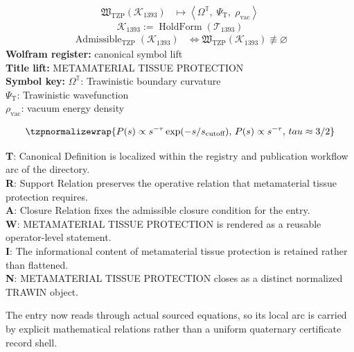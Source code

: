 \noindent
\begin{minipage}[t]{0.48\linewidth}
\begingroup
\small
\[
\begin{aligned}
\mathfrak{W}_{\mathrm{TZP}}\!\left(\mathcal{K}_{1393}\right)
&\longmapsto
\left\langle \Omega^{\mathbb{T}},\; \Psi_{\mathrm{T}},\; \rho_{\mathrm{vac}} \right\rangle
\end{aligned}
\]
\[
\mathcal{K}_{1393}
:=
\operatorname{HoldForm}\!\left(\mathcal{T}_{1393}\right)
\]
\[
\begin{aligned}
\operatorname{Admissible}_{\mathrm{TZP}}\!\left(\mathcal{K}_{1393}\right)
&\Longleftrightarrow
\mathfrak{W}_{\mathrm{TZP}}\!\left(\mathcal{K}_{1393}\right)\not\equiv\varnothing
\end{aligned}
\]
\textbf{Wolfram register:} canonical symbol lift\\
\textbf{Title lift:} METAMATERIAL TISSUE PROTECTION\\
\textbf{Symbol key:} \(\Omega^{\mathbb{T}}\): Trawinistic boundary curvature\\ \(\Psi_{\mathrm{T}}\): Trawinistic wavefunction\\ \(\rho_{\mathrm{vac}}\): vacuum energy density
\par
\endgroup
\end{minipage}\hfill
\begin{minipage}[t]{0.48\linewidth}
\[
\tzpnormalizewrap{P(s) \propto s^{-\tau} \exp(-s/s_{\text{cutoff}}),\,P(s) \propto s^{-\tau},\,tau \approx 3/2}
\]

\small
\textbf{T}: Canonical Definition is localized within the registry and publication workflow arc of the directory.\\
\textbf{R}: Support Relation preserves the operative relation that metamaterial tissue protection requires.\\
\textbf{A}: Closure Relation fixes the admissible closure condition for the entry.\\
\textbf{W}: METAMATERIAL TISSUE PROTECTION is rendered as a reusable operator-level statement.\\
\textbf{I}: The informational content of metamaterial tissue protection is retained rather than flattened.\\
\textbf{N}: METAMATERIAL TISSUE PROTECTION closes as a distinct normalized TRAWIN object.
\normalsize
\end{minipage}

The entry now reads through actual sourced equations, so its local arc is carried by explicit mathematical relations rather than a uniform quaternary certificate record shell.
\clearpage


